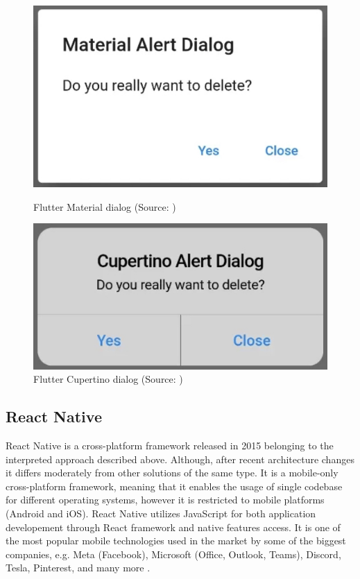 \begin{figure}[h]
	\begin{minipage}{.45\textwidth}
		\includegraphics[width=\textwidth]{img/flutter_material_dialog}
		\caption{Flutter Material dialog (Source: \cite{flutter_campus_dialog})}
		\label{fig:flutter_material_dialog}
	\end{minipage}
	\hfill
	\begin{minipage}{.45\textwidth}
		\includegraphics[width=\textwidth]{img/flutter_cupertino_dialog}
		\caption{Flutter Cupertino dialog (Source: \cite{flutter_campus_dialog})}
		\label{fig:flutter_cupertino_dialog}
	\end{minipage}
\end{figure}

\subsection{React Native}

React Native is a cross-platform framework released in 2015 belonging to the interpreted approach described above. Although, after recent architecture changes it differs moderately from other solutions of the same type. It is a mobile-only cross-platform framework, meaning that it enables the usage of single codebase for different operating systems, however it is restricted to mobile platforms (Android and iOS). React Native utilizes JavaScript for both application developement through React framework and native features access. It is one of the most popular mobile technologies used in the market by some of the biggest companies, e.g. Meta (Facebook), Microsoft (Office, Outlook, Teams), Discord, Tesla, Pinterest, and many more \cite{react_native_showcase, react_native_docs_core_concepts}.


